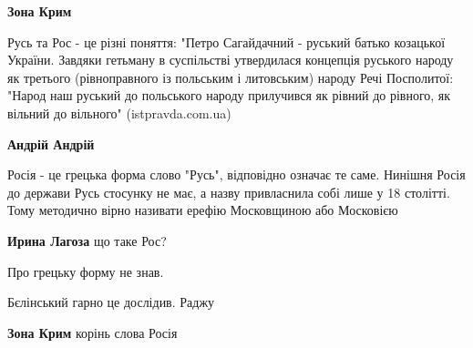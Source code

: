 \begin{itemize}
\begin{itemize}
\textbf{Зона Крим} 

Русь та Рос - це різні поняття: "Петро Сагайдачний - руський батько козацької
України.  Завдяки гетьману в суспільстві утвердилася концепція руського народу
як третього (рівноправного із польським і литовським) народу Речі Посполитої:
"Народ наш руський до польського народу прилучився як рівний до рівного, як
вільний до вільного" (istpravda.com.ua)

 
\textbf{Андрій Андрій} 

Росія - це грецька форма слово "Русь", відповідно
означає те саме. Нинішня Росія до держави Русь стосунку не має, а назву
привласнила собі лише у 18 столітті. Тому методично вірно називати ерефію
Московщиною або Московією

 
\textbf{Ирина Лагоза} що таке Рос?

 
Про грецьку форму не знав.

 
Бєлінський гарно це дослідив. Раджу

 
\textbf{Зона Крим} корінь слова Росія

 

\end{itemize}
\end{itemize}

